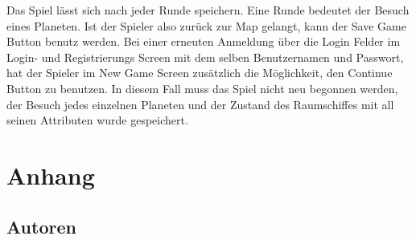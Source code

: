 \documentclass[fontsize=12pt,paper=a4,twoside]{scrartcl}
\begin{document}
Das Spiel lässt sich nach jeder Runde speichern. Eine Runde bedeutet der Besuch eines Planeten.
Ist der Spieler also zurück zur Map gelangt, kann der Save Game Button benutz werden.
Bei einer erneuten Anmeldung über die Login Felder im Login- und Registrierungs Screen mit dem selben
Benutzernamen und Passwort, hat der Spieler im New Game Screen zusätzlich die Möglichkeit, den Continue
Button zu benutzen. In diesem Fall muss das Spiel nicht neu begonnen werden, der Besuch jedes einzelnen Planeten und der Zustand des Raumschiffes mit all seinen Attributen wurde gespeichert.

\section{Anhang}
\subsection{Autoren}
\end{document}
